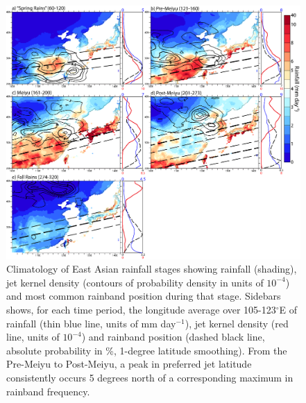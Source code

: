 \begin{figure}
\centering
\noindent\includegraphics[width=36pc]{Figures/ch4/climo}
\caption{Climatology of East Asian rainfall stages showing rainfall (shading), jet kernel density (contours of probability density in units of $10^{-4}$) and most common rainband position during that stage. Sidebars shows, for each time period, the longitude average over 105-123$^{\circ}$E of rainfall (thin blue line, units of mm day$^{-1}$), jet kernel density (red line, units of $10^{-4}$) and rainband position (dashed black line, absolute probability in \%, 1-degree latitude smoothing). From the Pre-Meiyu to Post-Meiyu, a peak in preferred jet latitude consistently occurs 5 degrees north of a corresponding maximum in rainband frequency.}
\label{fig:climo}
\end{figure}

